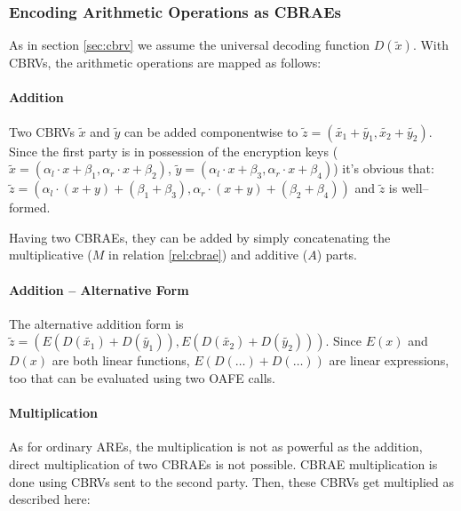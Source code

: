 \documentclass[12pt, a4paper]{article}
\begin{document}
\subsubsection{Encoding Arithmetic Operations as CBRAEs}
\label{sec:encode-cbrae}

As in section \ref{sec:cbrv} we assume the universal decoding function
$D(\widetilde{x})$. With CBRVs, the arithmetic operations are mapped as follows:


\paragraph{Addition}

Two CBRVs $\widetilde{x}$ and $\widetilde{y}$ can be added componentwise to
$\widetilde{z} = \left(\widetilde{x_1} + \widetilde{y_1}, \widetilde{x_2} +
\widetilde{y_2}\right)$. Since the first party is in
possession of the encryption keys ($\widetilde{x} = \left(\alpha_l \cdot x +
\beta_1, \alpha_r \cdot x + \beta_2\right)$, $\widetilde{y} = \left(\alpha_l
\cdot x + \beta_3, \alpha_r \cdot x + \beta_4\right)$) it's obvious that:
$\widetilde{z} = \left(\alpha_l \cdot (x+y) + (\beta_1 + \beta_3), \alpha_r
\cdot (x+y) + (\beta_2 + \beta_4)\right)$ and $\widetilde{z}$ is well--formed.

Having two CBRAEs, they can be added by simply concatenating the multiplicative
($M$ in relation \ref{rel:cbrae}) and additive ($A$) parts.


\paragraph{Addition -- Alternative Form}

The alternative addition form is
$\widetilde{z} =
\left( E\left(D(\widetilde{x_1}) + D(\widetilde{y_1})\right),
       E\left(D(\widetilde{x_2}) + D(\widetilde{y_2})\right)
\right)$.
Since $E(x)$ and $D(x)$ are both linear functions,
$E\left(D(\ldots) +D(\ldots)\right)$
are linear expressions, too that can be evaluated using two OAFE calls.


\paragraph{Multiplication}

As for ordinary AREs, the multiplication is not as powerful as the addition,
direct multiplication of two CBRAEs is not possible. CBRAE multiplication is
done using CBRVs sent to the second party. Then, these CBRVs get multiplied as
described here:
\end{document}

